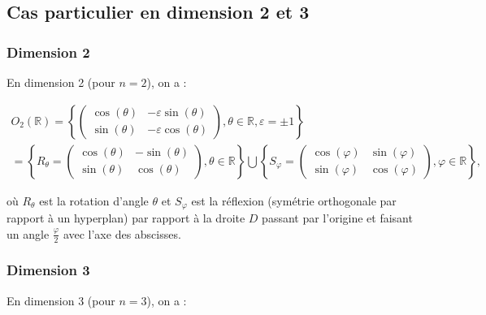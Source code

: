 \documentclass[french]{book}
\theoremstyle{definition}
\theoremstyle{remark}
\begin{document}
\subsection{Cas particulier en dimension 2 et 3}

\subsubsection{Dimension 2}


En dimension 2 (pour \(n=2\)), on a :

  \begin{gather*}
    O_2(\mathbb{R}) = \left\{  \begin{pmatrix}
    \cos(\theta) & - \varepsilon\sin(\theta) \\
    \sin(\theta) & - \varepsilon\cos(\theta)
  \end{pmatrix}, \theta \in \mathbb{R}, \varepsilon = \pm 1 \right\} \\
  = \left\{ R _{\theta} = \begin{pmatrix}
  \cos(\theta) & - \sin(\theta) \\
  \sin(\theta) & \cos(\theta)
\end{pmatrix}, \theta \in \mathbb{R} \right\} \bigcup \left\{ S _{\varphi} = \begin{pmatrix}
\cos(\varphi) & \sin(\varphi) \\
\sin(\varphi) & \cos(\varphi)
\end{pmatrix}, \varphi \in \mathbb{R} \right\},
  \end{gather*}

  où \(R _{\theta}\) est la rotation d'angle \(\theta\) et \(S _{\varphi}\) est la réflexion (symétrie orthogonale par rapport à un hyperplan) par rapport à la droite \(D\) passant par l'origine et faisant un angle \(\displaystyle\frac{\varphi}{2}\) avec l'axe des abscisses.

\subsubsection{Dimension 3}

En dimension 3 (pour \(n=3\)), on a :
\end{document}
